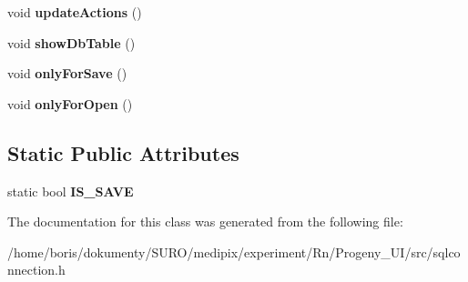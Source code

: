 \begin{DoxyCompactItemize}
\item 
\hypertarget{classSqlConnection_a1f632f61a1baa84358b04600fd5cf1c6}{void {\bfseries update\-Actions} ()}\label{classSqlConnection_a1f632f61a1baa84358b04600fd5cf1c6}

\item 
\hypertarget{classSqlConnection_aa6435ff7a964d00418457111f6f33380}{void {\bfseries show\-Db\-Table} ()}\label{classSqlConnection_aa6435ff7a964d00418457111f6f33380}

\item 
\hypertarget{classSqlConnection_ab497606fdbaefeedf5c9d4223fea3a1d}{void {\bfseries only\-For\-Save} ()}\label{classSqlConnection_ab497606fdbaefeedf5c9d4223fea3a1d}

\item 
\hypertarget{classSqlConnection_a859135cab392d805adc40a58f6d0adf9}{void {\bfseries only\-For\-Open} ()}\label{classSqlConnection_a859135cab392d805adc40a58f6d0adf9}

\end{DoxyCompactItemize}
\subsection*{Static Public Attributes}
\begin{DoxyCompactItemize}
\item 
\hypertarget{classSqlConnection_a0d53b0970637eed7f37c8190fdb2095a}{static bool {\bfseries I\-S\-\_\-\-S\-A\-V\-E}}\label{classSqlConnection_a0d53b0970637eed7f37c8190fdb2095a}

\end{DoxyCompactItemize}


The documentation for this class was generated from the following file\-:\begin{DoxyCompactItemize}
\item 
/home/boris/dokumenty/\-S\-U\-R\-O/medipix/experiment/\-Rn/\-Progeny\-\_\-\-U\-I/src/sqlconnection.\-h\end{DoxyCompactItemize}
